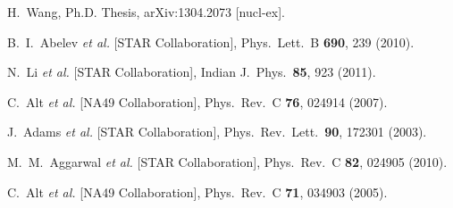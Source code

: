 \begin{thebibliography}{99}
  H.~Wang, Ph.D. Thesis,
  arXiv:1304.2073 [nucl-ex].

  B.~I.~Abelev {\it et al.} [STAR Collaboration],
  Phys.\ Lett.\ B {\bf 690}, 239 (2010).

\cite{Li:2011zzx}
  N.~Li {\it et al.} [STAR Collaboration],
  Indian J.\ Phys.\  {\bf 85}, 923 (2011).

  C.~Alt {\it et al.} [NA49 Collaboration],
  Phys.\ Rev.\ C {\bf 76}, 024914 (2007).

  J.~Adams {\it et al.} [STAR Collaboration],
  Phys.\ Rev.\ Lett.\  {\bf 90}, 172301 (2003).
   
  M.~M.~Aggarwal {\it et al.} [STAR Collaboration],
  Phys.\ Rev.\ C {\bf 82}, 024905 (2010).

\cite{Alt:2004gx}
 C.~Alt {\it et al.} [NA49 Collaboration],
  Phys.\ Rev.\ C {\bf 71}, 034903 (2005).


\end{thebibliography}
